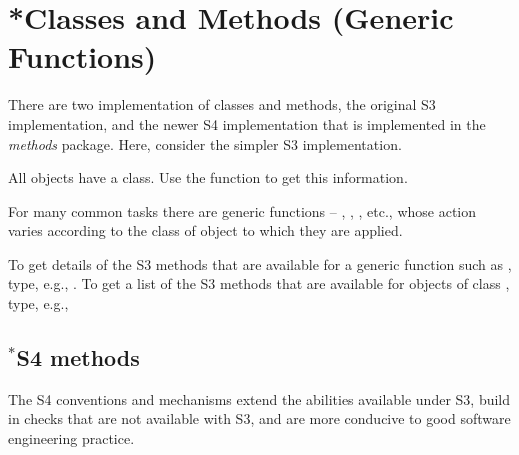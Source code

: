 \section{*Classes and Methods (Generic Functions)}\label{sec:generic}

\vspace*{6pt}
%

There are two implementation of classes and methods, the original S3
implementation, and the newer S4 implementation that is implemented in
the \textit{methods} package. Here, consider the simpler S3
implementation.

All objects have a class. Use the function  to get this
information.

For many common tasks there are generic functions --
, , , etc., whose action
varies according to the class of object to which they are applied.

To get details of the S3 methods that are available for a generic
function such as , type, e.g.,
. To get a list of the S3 methods that are available for
  objects of class , type, e.g.,

\subsection{$^*$S4 methods}\label{ss:S4}
   The S4 conventions and mechanisms extend the abilities
available under S3, build in checks that are not available with S3,
and are more conducive to good software engineering practice.

